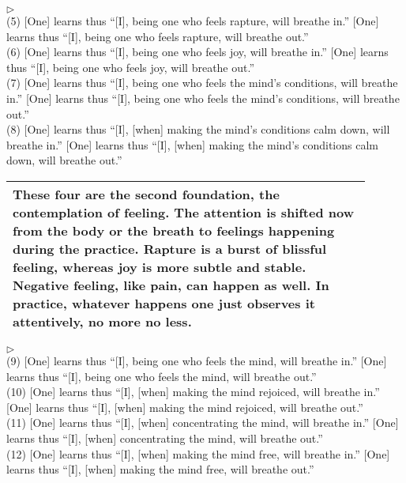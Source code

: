 \addtocounter{sennum}{-1}
$\triangleright$ \\
(5) [One] learns thus ``[I], being one who feels rapture, will breathe in.'' [One] learns thus ``[I], being one who feels rapture, will breathe out.''\\
(6) [One] learns thus ``[I], being one who feels joy, will breathe in.'' [One] learns thus ``[I], being one who feels joy, will breathe out.''\\
(7) [One] learns thus ``[I], being one who feels the mind's conditions, will breathe in.'' [One] learns thus ``[I], being one who feels the mind's conditions, will breathe out.''\\
(8) [One] learns thus ``[I], [when] making the mind's conditions calm down, will breathe in.'' [One] learns thus ``[I], [when] making the mind's conditions calm down, will breathe out.''\\

\begin{longtable}[c]{|p{0.9\linewidth}|}
\hline
\hspace{5mm}\small These four are the second foundation, the contemplation of feeling. The attention is shifted now from the body or the breath to feelings happening during the practice. Rapture is a burst of blissful feeling, whereas joy is more subtle and stable. Negative feeling, like pain, can happen as well. In practice, whatever happens one just observes it attentively, no more no less.\\
\hline
\end{longtable}


\addtocounter{sennum}{-1}
$\triangleright$ \\
(9) [One] learns thus ``[I], being one who feels the mind, will breathe in.'' [One] learns thus ``[I], being one who feels the mind, will breathe out.''\\
(10) [One] learns thus ``[I], [when] making the mind rejoiced, will breathe in.'' [One] learns thus ``[I], [when] making the mind rejoiced, will breathe out.''\\
(11) [One] learns thus ``[I], [when] concentrating the mind, will breathe in.'' [One] learns thus ``[I], [when] concentrating the mind, will breathe out.''\\
(12) [One] learns thus ``[I], [when] making the mind free, will breathe in.'' [One] learns thus ``[I], [when] making the mind free, will breathe out.''\\

